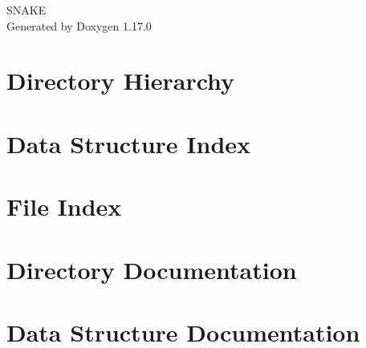 \documentclass[twoside]{book}
\newcommand{\+}{\discretionary{\mbox{\scriptsize$\hookleftarrow$}}{}{}}
\newcommand{\clearemptydoublepage}{%
    \newpage{\pagestyle{empty}\cleardoublepage}%
  }
\begin{document}
  \raggedbottom
    \hypersetup{pageanchor=false,
                bookmarksnumbered=true,
                pdfencoding=unicode
               }
  \begin{titlepage}
  \vspace*{7cm}
  \begin{center}%
  {\Large SNAKE}\\
  \vspace*{1cm}
  {\large Generated by Doxygen 1.17.0}\\
  \end{center}
  \end{titlepage}
  \clearemptydoublepage
  \tableofcontents
  \clearemptydoublepage
  \hypersetup{pageanchor=true}
\chapter{Directory Hierarchy}

\chapter{Data Structure Index}

\chapter{File Index}

\chapter{Directory Documentation}









\chapter{Data Structure Documentation}



\end{document}
